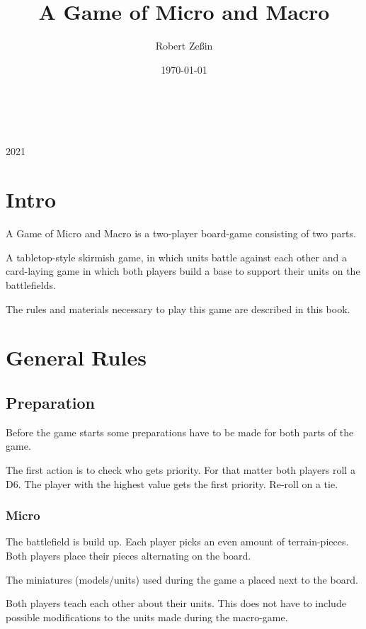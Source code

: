 \documentclass[a5paper,pagesize,10pt,bibtotoc,pointlessnumbers,
normalheadings,DIV=9,twoside=false]{scrbook}
\title{A Game of Micro and Macro}
\author{Robert Zeßin}
\date{\today}
\begin{document}
\begin{titlepage}
		\\
			
		\vspace{10mm}
		\\
		\vspace{\fill}
		\centering \large{2021}
\end{titlepage}

\newpage
\chapter{Intro}

A Game of Micro and Macro is a two-player board-game consisting of two parts.

A tabletop-style skirmish game, in which units battle against each other and a card-laying game in which both players build a base to support their units on the battlefields.

The rules and materials necessary to play this game are described in this book.

\newpage
\tableofcontents 


\newpage
\chapter{General Rules}

\section{Preparation}
Before the game starts some preparations have to be made for both parts of the game.

The first action is to check who gets priority. For that matter both players roll a D6. The player with the highest value gets the first priority. Re-roll on a tie.

\subsection{Micro}
The battlefield is build up. Each player picks an even amount of terrain-pieces. Both players place their pieces alternating on the board.

The miniatures (models/units) used during the game a placed next to the board.

Both players teach each other about their units. This does not have to include possible modifications to the units made during the macro-game.
\end{document}
